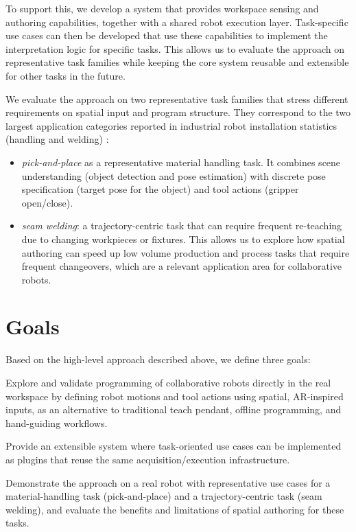 To support this, we develop a system that provides workspace sensing and authoring capabilities, together with a shared robot execution layer. Task-specific use cases can then be developed that use these capabilities to implement the interpretation logic for specific tasks. This allows us to evaluate the approach on representative task families while keeping the core system reusable and extensible for other tasks in the future.

We evaluate the approach on two representative task families that stress different requirements on spatial input and program structure. They correspond to the two largest application categories reported in industrial robot installation statistics (handling and welding) \cite{IFRWorldRobotics2023Extended}:
\begin{itemize}
    \item \emph{pick-and-place} as a representative material handling task. It combines scene understanding (object detection and pose estimation) with discrete pose specification (target pose for the object) and tool actions (gripper open/close).

    \item \emph{seam welding}: a trajectory-centric task that can require frequent re-teaching due to changing workpieces or fixtures. This allows us to explore how spatial authoring can speed up low volume production and process tasks that require frequent changeovers, which are a relevant application area for collaborative robots.
\end{itemize}


\section*{Goals}

Based on the high-level approach described above, we define three goals:
\begin{goals}
  \item \label{goal:1} Explore and validate programming of collaborative robots directly in the real workspace by defining robot motions and tool actions using spatial, AR-inspired inputs, as an alternative to traditional teach pendant, offline programming, and hand-guiding workflows.
  \item \label{goal:2} Provide an extensible system where task-oriented use cases can be implemented as plugins that reuse the same acquisition/execution infrastructure.
  \item \label{goal:3} Demonstrate the approach on a real robot with representative use cases for a material-handling task (pick-and-place) and a trajectory-centric task (seam welding), and evaluate the benefits and limitations of spatial authoring for these tasks.
\end{goals}


